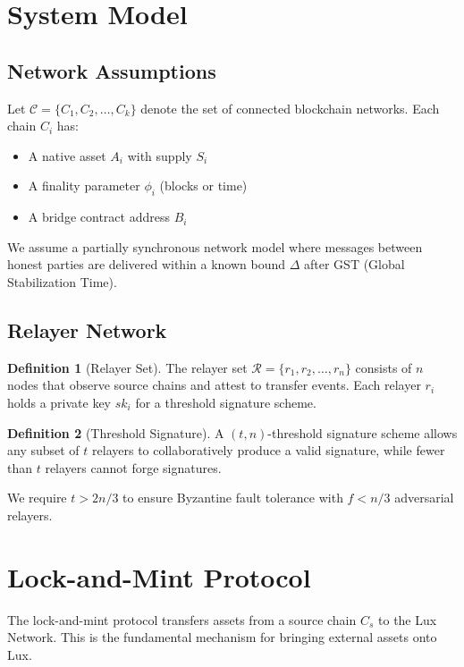 \documentclass[11pt,a4paper]{article}
\theoremstyle{definition}
\newtheorem{definition}{Definition}
\begin{document}
\section{System Model}

\subsection{Network Assumptions}

Let $\mathcal{C} = \{C_1, C_2, \ldots, C_k\}$ denote the set of connected blockchain networks. Each chain $C_i$ has:
\begin{itemize}
    \item A native asset $A_i$ with supply $S_i$
    \item A finality parameter $\phi_i$ (blocks or time)
    \item A bridge contract address $B_i$
\end{itemize}

We assume a partially synchronous network model where messages between honest parties are delivered within a known bound $\Delta$ after GST (Global Stabilization Time).

\subsection{Relayer Network}

\begin{definition}[Relayer Set]
The relayer set $\mathcal{R} = \{r_1, r_2, \ldots, r_n\}$ consists of $n$ nodes that observe source chains and attest to transfer events. Each relayer $r_i$ holds a private key $sk_i$ for a threshold signature scheme.
\end{definition}

\begin{definition}[Threshold Signature]
A $(t, n)$-threshold signature scheme allows any subset of $t$ relayers to collaboratively produce a valid signature, while fewer than $t$ relayers cannot forge signatures.
\end{definition}

We require $t > 2n/3$ to ensure Byzantine fault tolerance with $f < n/3$ adversarial relayers.

\section{Lock-and-Mint Protocol}

The lock-and-mint protocol transfers assets from a source chain $C_s$ to the Lux Network. This is the fundamental mechanism for bringing external assets onto Lux.
\end{document}

